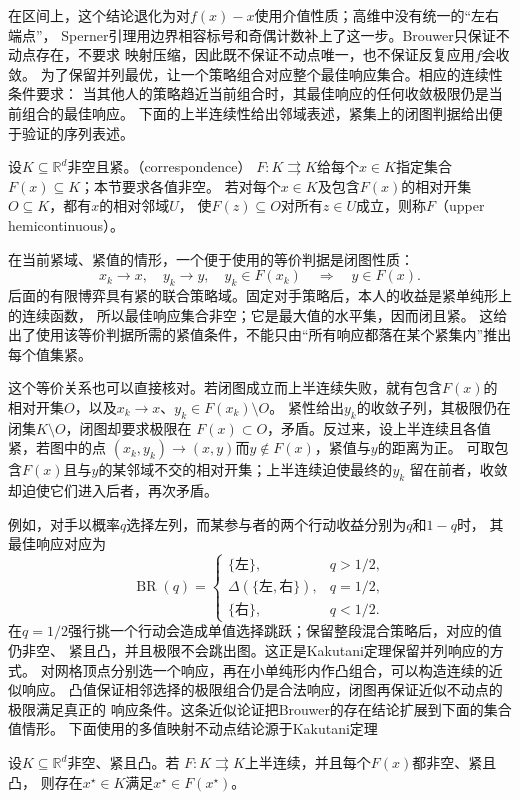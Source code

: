 在区间上，这个结论退化为对\(f(x)-x\)使用介值性质；高维中没有统一的“左右端点”，
Sperner引理用边界相容标号和奇偶计数补上了这一步。Brouwer只保证不动点存在，不要求
映射压缩，因此既不保证不动点唯一，也不保证反复应用\(f\)会收敛。
为了保留并列最优，让一个策略组合对应整个最佳响应集合。相应的连续性条件要求：
当其他人的策略趋近当前组合时，其最佳响应的任何收敛极限仍是当前组合的最佳响应。
下面的上半连续性给出邻域表述，紧集上的闭图判据给出便于验证的序列表述。
\begin{definition}[集合值映射与上半连续性]
\label{def:game-upper-hemicontinuous-correspondence}
设$K\subseteq\mathbb R^d$非空且紧。（correspondence）
\(F:K\rightrightarrows K\)给每个$x\in K$指定集合$F(x)\subseteq K$；本节要求各值非空。
若对每个$x\in K$及包含$F(x)$的相对开集$O\subseteq K$，都有$x$的相对邻域$U$，
使$F(z)\subseteq O$对所有$z\in U$成立，则称$F$（upper hemicontinuous）。
\end{definition}
在当前紧域、紧值的情形，一个便于使用的等价判据是闭图性质：
\[
  x_k\to x,\quad y_k\to y,\quad y_k\in F(x_k)
  \quad\Longrightarrow\quad
  y\in F(x).
\]
后面的有限博弈具有紧的联合策略域。固定对手策略后，本人的收益是紧单纯形上的连续函数，
所以最佳响应集合非空；它是最大值的水平集，因而闭且紧。
这给出了使用该等价判据所需的紧值条件，不能只由“所有响应都落在某个紧集内”推出每个值集紧。

这个等价关系也可以直接核对。若闭图成立而上半连续失败，就有包含\(F(x)\)的
相对开集\(O\)，以及\(x_k\to x\)、\(y_k\in F(x_k)\setminus O\)。
紧性给出\(y_k\)的收敛子列，其极限仍在闭集\(K\setminus O\)，闭图却要求极限在
\(F(x)\subset O\)，矛盾。反过来，设上半连续且各值紧，若图中的点
\((x_k,y_k)\to(x,y)\)而\(y\notin F(x)\)，紧值与\(y\)的距离为正。
可取包含\(F(x)\)且与\(y\)的某邻域不交的相对开集；上半连续迫使最终的\(y_k\)
留在前者，收敛却迫使它们进入后者，再次矛盾。

例如，对手以概率\(q\)选择左列，而某参与者的两个行动收益分别为\(q\)和\(1-q\)时，
其最佳响应对应为
\[
  \operatorname{BR}(q)
  =
  \begin{cases}
    \{\text{左}\},&q>1/2,\\
    \Delta(\{\text{左},\text{右}\}),&q=1/2,\\
    \{\text{右}\},&q<1/2.
  \end{cases}
\]
在\(q=1/2\)强行挑一个行动会造成单值选择跳跃；保留整段混合策略后，对应的值仍非空、
紧且凸，并且极限不会跳出图。这正是Kakutani定理保留并列响应的方式。
对网格顶点分别选一个响应，再在小单纯形内作凸组合，可以构造连续的近似响应。
凸值保证相邻选择的极限组合仍是合法响应，闭图再保证近似不动点的极限满足真正的
响应条件。这条近似论证把Brouwer的存在结论扩展到下面的集合值情形。
下面使用的多值映射不动点结论源于Kakutani定理
\begin{theorem}[Kakutani不动点定理]
\label{thm:game-kakutani}
设\(K\subseteq\mathbb{R}^d\)非空、紧且凸。若
\(F:K\rightrightarrows K\)上半连续，并且每个\(F(x)\)都非空、紧且凸，
则存在\(x^\star\in K\)满足\(x^\star\in F(x^\star)\)。
\end{theorem}

